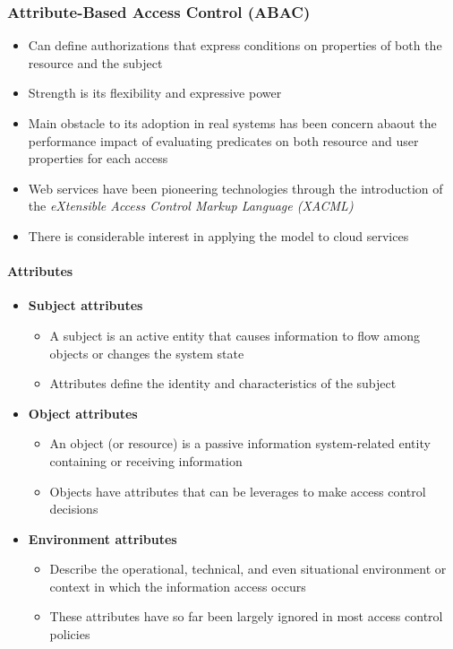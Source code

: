 \subsubsection{Attribute-Based Access Control (ABAC)}
\begin{itemize}
    \item Can define authorizations that express conditions on properties of both the resource and the subject
    \item Strength is its flexibility and expressive power
    \item Main obstacle to its adoption in real systems has been concern abaout the performance impact of evaluating predicates on both resource and user properties for each access
    \item Web services have been pioneering technologies through the introduction of the \textit{eXtensible Access Control Markup Language (XACML)}
    \item There is considerable interest in applying the model to cloud services\\
\end{itemize}

\paragraph{Attributes}
\begin{itemize}
    \item \textbf{Subject attributes}
    \begin{itemize}
        \item A subject is an active entity that causes information to flow among objects or changes the system state
        \item Attributes define the identity and characteristics of the subject
    \end{itemize}
    \item \textbf{Object attributes}
    \begin{itemize}
        \item An object (or resource) is a passive information system-related entity containing or receiving information
        \item Objects have attributes that can be leverages to make access control decisions
    \end{itemize}
    \item \textbf{Environment attributes}
    \begin{itemize}
        \item Describe the operational, technical, and even situational environment or context in which the information access occurs
        \item These attributes have so far been largely ignored in most access control policies
    \end{itemize}
\end{itemize}

